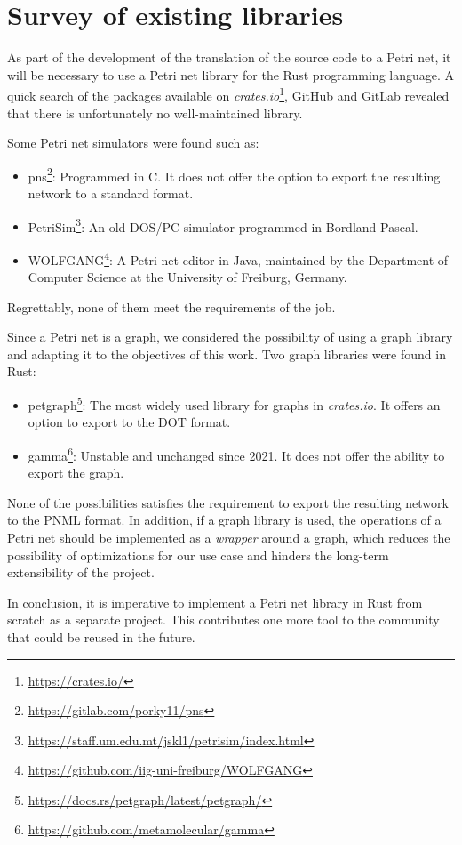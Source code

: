 \documentclass[../Thesis.tex]{subfiles}
\begin{document}
\section{Survey of existing libraries}

As part of the development of the translation of the source code to a Petri net,
it will be necessary to use a Petri net library for the Rust programming language.
A quick search of the packages available on
\emph{crates.io}\footnote{\url{https://crates.io/}}, GitHub and GitLab
revealed that there is unfortunately no well-maintained library.

Some Petri net simulators were found such as:

\begin{itemize}
    \item pns\footnote{\url{https://gitlab.com/porky11/pns}}:
          Programmed in C. It does not offer the option
          to export the resulting network to a standard format.
    \item PetriSim\footnote{\url{https://staff.um.edu.mt/jskl1/petrisim/index.html}}:
          An old DOS/PC simulator programmed in Bordland Pascal.
    \item WOLFGANG\footnote{\url{https://github.com/iig-uni-freiburg/WOLFGANG}}:
          A Petri net editor in Java, maintained by the Department of Computer Science
          at the University of Freiburg, Germany.
\end{itemize}

Regrettably, none of them meet the requirements of the job.

Since a Petri net is a graph, we considered the possibility
of using a graph library and adapting it to the objectives of this work.
Two graph libraries were found in Rust:

\begin{itemize}
    \item petgraph\footnote{\url{https://docs.rs/petgraph/latest/petgraph/}}:
          The most widely used library for graphs in \textit{crates.io}.
          It offers an option to export to the DOT format.
    \item gamma\footnote{\url{https://github.com/metamolecular/gamma}}:
          Unstable and unchanged since 2021. It does not offer the ability to export the graph.
\end{itemize}

None of the possibilities satisfies the requirement
to export the resulting network to the PNML format.
In addition, if a graph library is used,
the operations of a Petri net should be implemented as a \emph{wrapper} around a graph,
which reduces the possibility of optimizations for our use case
and hinders the long-term extensibility of the project.

In conclusion, it is imperative
to implement a Petri net library in Rust from scratch as a separate project.
This contributes one more tool to the community that could be reused in the future.
\end{document}
